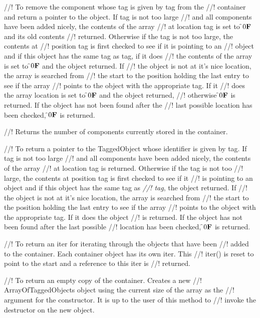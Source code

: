  
//! To remove the component whose tag is given by \p tag from the
//! container and return a pointer to the object. If tag is not too large
//! and all components have been added nicely, the contents of the array
//! at location \p tag is set to \f$0{\bf F}$ and its old contents
//! returned. Otherwise if the tag is not too large, the contents at
//! position \p tag is first checked to see if it is pointing to an
//! object and if this object has the same tag as \p tag, if it does
//! the contents of the array is set to \f$0{\bf F}$ and the object returned. If
//! the object is not at it's nice location, the array is searched from
//! the start to the position holding the last entry to see if the array
//! points to the object with the appropriate tag. If it 
//! does the array location is set to \f$0{\bf F}$ and the object returned,
//! otherwise \f$0{\bf F}$ is returned. If the object has not been found after the
//! last possible location has been checked, \f$0{\bf F}$ is returned.

//! Returns the number of components currently stored in the container.

//! To return a pointer to the TaggedObject whose identifier is given by
\p tag. If tag is not too large
//! and all components have been added nicely, the contents of the array
//! at location \p tag is returned. Otherwise if the tag is not too
//! large, the contents at position \p tag is first checked to see if it
//! is pointing to an object and if this object has the same tag as {\em
//! tag}, the object returned. If 
//! the object is not at it's nice location, the array is searched from
//! the start to the position holding the last entry to see if the array
//! points to the object with the appropriate tag. If it does the object
//! is returned. If the object has not been found after the last possible
//! location has been checked, \f$0{\bf F}$ is returned.


//! To return an iter for iterating through the objects that have been
//! added to the container. Each container object has its own iter. This
//! iter() is reset to point to the start and a reference to this iter is
//! returned. 

//! To return an empty copy of the container. Creates a new
//! ArrayOfTaggedObjects object using the current size of the array as the
//! argument for the constructor. It is up to the user of this method to
//! invoke the destructor on the new object.

